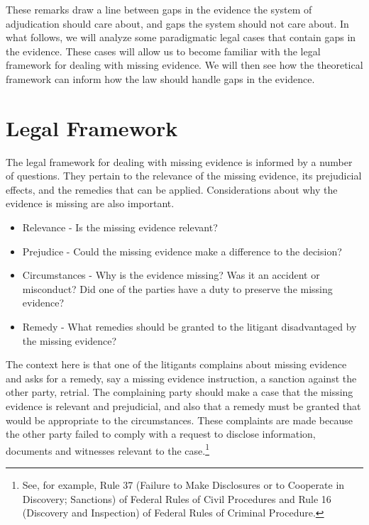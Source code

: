 \documentclass[
  10pt,
  dvipsnames,enabledeprecatedfontcommands]{scrartcl}
\begin{document}
These remarks draw a line between gaps in the evidence the system of
adjudication should care about, and gaps the system should not care
about. In what follows, we will analyze some paradigmatic legal cases
that contain gaps in the evidence. These cases will allow us to become
familiar with the legal framework for dealing with missing evidence. We
will then see how the theoretical framework can inform how the law
should handle gaps in the evidence.

\hypertarget{legal-framework}{%
\section{Legal Framework}\label{legal-framework}}

The legal framework for dealing with missing evidence is informed by a
number of questions. They pertain to the relevance of the missing
evidence, its prejudicial effects, and the remedies that can be applied.
Considerations about why the evidence is missing are also important.

\begin{itemize}
\item[] Relevance - Is the missing evidence relevant?
\item[] Prejudice - Could the missing evidence make a difference to the decision?
\item[] Circumstances - Why is the evidence missing? Was it an accident or misconduct? Did one of the parties have a duty to preserve the missing evidence?
\item[] Remedy - What remedies should be granted to the litigant disadvantaged 
by the missing evidence?
\end{itemize}

\noindent The context here is that one of the litigants complains about
missing evidence and asks for a remedy, say a missing evidence
instruction, a sanction against the other party, retrial. The
complaining party should make a case that the missing evidence is
relevant and prejudicial, and also that a remedy must be granted that
would be appropriate to the circumstances. These complaints are made
because the other party failed to comply with a request to disclose
information, documents and witnesses relevant to the case.\footnote{See,
  for example, Rule 37 (Failure to Make Disclosures or to Cooperate in
  Discovery; Sanctions) of Federal Rules of Civil Procedures and Rule 16
  (Discovery and Inspection) of Federal Rules of Criminal Procedure.}
\end{document}
